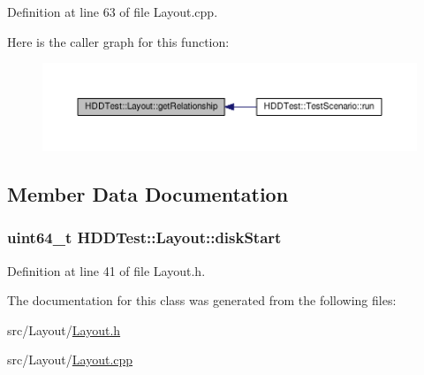 Definition at line 63 of file Layout.\-cpp.



Here is the caller graph for this function\-:\nopagebreak
\begin{figure}[H]
\begin{center}
\leavevmode
\includegraphics[width=350pt]{class_h_d_d_test_1_1_layout_af7aef9c0227433e1cfc6252cb85e8dc3_icgraph}
\end{center}
\end{figure}




\subsection{Member Data Documentation}
\hypertarget{class_h_d_d_test_1_1_layout_aeba9e8e44b4ba70259ff783680b988fe}{
\subsubsection[{disk\-Start}]{\setlength{\rightskip}{0pt plus 5cm}uint64\-\_\-t H\-D\-D\-Test\-::\-Layout\-::disk\-Start}}\label{class_h_d_d_test_1_1_layout_aeba9e8e44b4ba70259ff783680b988fe}


Definition at line 41 of file Layout.\-h.



The documentation for this class was generated from the following files\-:\begin{DoxyCompactItemize}
\item 
src/\-Layout/\hyperlink{_layout_8h}{Layout.\-h}\item 
src/\-Layout/\hyperlink{_layout_8cpp}{Layout.\-cpp}\end{DoxyCompactItemize}
